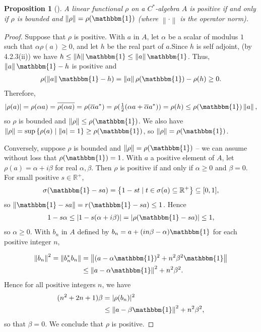 \documentclass[11pt,a4paper]{report}
\theoremstyle{plain}
\newtheorem{prop}{Proposition}
\theoremstyle{definition}
\newcommand{\1}{\mathbbm{1}}
\newcommand{\R}{\mathbb{R}}
\newcommand{\spec}[1]{\sigma(#1)}
\begin{document}
\begin{prop}[{\cite[4.3.2]{kadison83}}]\label{prop:432}
	A linear functional $\rho$ on a $C^\ast$-algebra $A$ is positive if and only if 
	$\rho$ is bounded and $\left\|\rho\right\| = \rho(\1)$ (where 
	$\left\|\cdot\right\|$ is the operator norm).
\end{prop}
\begin{proof}
	Suppose that $\rho$ is positive. With $a$ in $A$, let $\alpha$ be a scalar of 
	modulus $1$ such that $\alpha\rho(a)\geq 0$, and let $h$ be the real part of 
	$a$.Since $h$ is self adjoint, (by 4.2.3(ii)) we have $h \leq \left\|h\right\|\1 
	\leq \left\|a\right\|\1$. Thus, $\left\|a\right\|\1-h$ is positive and 
	\begin{align*}
		\rho(\left\|a\right\|\1-h) = \left\|a\right\|\rho(\1)-\rho(h) \geq 0.
	\end{align*}
	Therefore,
	\begin{align*}
		|\rho(a)| 	= \rho(\alpha a) = \overline{\rho(\alpha a)} 
					= \rho(\overline{\alpha}a^\ast) 
					= \rho(\tfrac{1}{2}(\alpha a +\overline{\alpha}a^\ast))
					= \rho(h) \leq \rho(\1) \left\|a\right\|,
	\end{align*}
	so $\rho$ is bounded and $\left\|\rho\right\| \leq \rho(\1)$. We also have 
	$\left\|\rho\right\| = \sup\left\{\rho(a) \mid \left\|a\right| = 1\right\} \geq 
	\rho(\1)$, so $\left\|\rho\right\|=\rho(\1)$.

	
	Conversely, suppose $\rho$ is bounded and $\left\|\rho\right\| = \rho(\1)$ -- we 
	can assume without loss that $\rho(\1)=1$. With $a$ a positive element of $A$, 
	let $\rho(a)=\alpha+i\beta$ for real $\alpha,\beta$. Then $\rho$ is positive if 
	and only if $\alpha \geq 0$ and $\beta = 0$.
	For small positive $s \in \R^+$, 
	\begin{align*}
		\spec{\1-sa} = \left\{1-st \mid t\in \spec{a} 
							\subseteq \R^+\right\} \subseteq [0,1],
	\end{align*}
	so $\left\|\1-sa\right\| = r(\1-sa) \leq 1$. Hence
	\begin{align*}
		1-s\alpha \leq |1-s(\alpha+i\beta)| = |\rho(\1 - sa)| \leq 1,
	\end{align*}
	so $\alpha\geq0$. With $b_n$ in $A$ defined by $b_n= a+(in\beta-\alpha)\1$ for 
	each positive integer $n$,

	\begin{align*}
				\left\|b_n\right\|^2 = \left\|b_n^\ast b_n\right\| 
		&= 		\left\|(a-\alpha\1)^2 + n^2\beta^2\1\right\| 								\\
		&\leq 	\left\|a-\alpha\1\right\|^2 +n^2\beta^2.
	\end{align*}
	Hence for all positive integers $n$, we have
	\begin{align*}
				(n^2+2n+1)\beta 
		&=	 	|\rho(b_n)|^2  																\\
		&\leq 	\left\|a-\beta\1\right\|^2 +n^2\beta^2,
	\end{align*}
	so that $\beta=0$. We conclude that $\rho$ is positive.
\end{proof}
\end{document}

